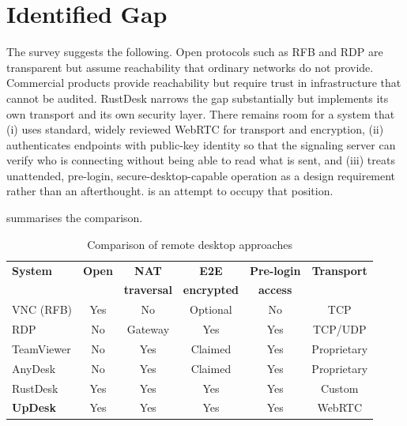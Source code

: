 \section{Identified Gap}

The survey suggests the following. Open protocols such as RFB and RDP are
transparent but assume reachability that ordinary networks do not provide.
Commercial products provide reachability but require trust in infrastructure
that cannot be audited. RustDesk narrows the gap substantially but implements
its own transport and its own security layer. There remains room for a system
that (i) uses standard, widely reviewed WebRTC for transport and encryption,
(ii) authenticates endpoints with public-key identity so that the signaling
server can verify who is connecting without being able to read what is sent, and
(iii) treats unattended, pre-login, secure-desktop-capable operation as a design
requirement rather than an afterthought. \updesk{} is an attempt to occupy that
position.

 summarises the comparison.

\begin{table}[H]
\centering
\caption{Comparison of remote desktop approaches}
\label{tab:comparison}
\small
\begin{tabular}{@{}lccccc@{}}
\toprule
\textbf{System} & \textbf{Open} & \textbf{NAT} & \textbf{E2E} & \textbf{Pre-login} & \textbf{Transport} \\
 & & \textbf{traversal} & \textbf{encrypted} & \textbf{access} & \\
\midrule
VNC (RFB)   & Yes & No      & Optional & No  & TCP \\
RDP         & No  & Gateway & Yes      & Yes & TCP/UDP \\
TeamViewer  & No  & Yes     & Claimed  & Yes & Proprietary \\
AnyDesk     & No  & Yes     & Claimed  & Yes & Proprietary \\
RustDesk    & Yes & Yes     & Yes      & Yes & Custom \\
\textbf{UpDesk} & Yes & Yes & Yes      & Yes & WebRTC \\
\bottomrule
\end{tabular}
\end{table}
